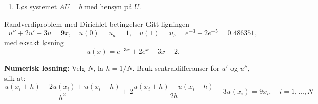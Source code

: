 \begin{enumerate}
    Høyresiden er da $
    \vect{b} = [u_a, h^2 r(x_1), \dots, h^2 r(x_{N-1}), u_b]^T$
    \item Løs systemet \( AU = b \) med hensyn på \( U \).
\end{enumerate}

\begin{eks}{Randverdiproblem med Dirichlet-betingelser}
\label{ex1:RVP}
Gitt ligningen
\[
u'' + 2u' - 3u = 9x, \quad u(0) = u_a = 1, \quad u(1) = u_b = e^{-3} + 2e^{-5} = 0.486351,
\]
med eksakt løsning
\[
u(x) = e^{-3x} + 2e^x - 3x - 2.
\]
\end{eks}
\textbf{Numerisk løsning:} 
Velg \(N\), la \(h = 1/N\). Bruk sentraldifferanser for \(u'\) og \(u''\), slik at:
\[
\frac{u(x_i + h) - 2u(x_i) + u(x_i - h)}{h^2}
+ 2\frac{u(x_i + h) - u(x_i - h)}{2h}
- 3u(x_i) = 9x_i, \quad i = 1, \dots, N
\]

